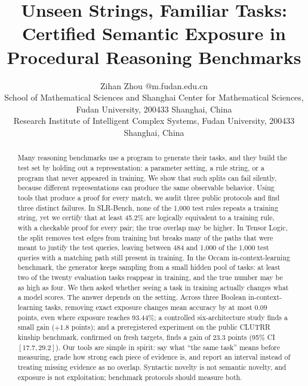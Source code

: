 \documentclass[twoside,11pt]{article}
\begin{document}
\title{Unseen Strings, Familiar Tasks: Certified Semantic Exposure in
Procedural Reasoning Benchmarks}

\author{\name Zihan Zhou @m.fudan.edu.cn \\
       \addr School of Mathematical Sciences and Shanghai Center for
       Mathematical Sciences, Fudan University, 200433 Shanghai, China \\
       \addr Research Institute of Intelligent Complex Systems,
       Fudan University, 200433 Shanghai, China}

\maketitle

\begin{abstract}
Many reasoning benchmarks use a program to generate their tasks, and they
build the test set by holding out a representation: a parameter setting, a
rule string, or a program that never appeared in training.  We show that
such splits can fail silently, because different representations can
produce the same observable behavior.  Using tools that produce a proof for
every match, we audit three public protocols and find three distinct
failures.  In SLR-Bench, none of the 1,000 test rules repeats a training
string, yet we certify that at least 45.2\% are logically equivalent to a
training rule, with a checkable proof for every pair; the true overlap may
be higher.  In Tensor Logic, the split removes test edges from training but
breaks many of the paths that were meant to justify the test queries,
leaving between 484 and 1,000 of the 1,000 test queries with a matching
path still present in training.  In the Occam in-context-learning
benchmark, the generator keeps sampling from a small hidden pool of tasks:
at least two of the twenty evaluation tasks reappear in training, and the
true number may be as high as four.  We then asked whether seeing a task in
training actually changes what a model scores.  The answer depends on the
setting.  Across three Boolean in-context-learning tasks, removing exact
exposure changes mean accuracy by at most 0.09 points, even where exposure
reaches 93.44\%; a controlled six-architecture study finds a small gain
($+1.8$ points); and a preregistered experiment on the public CLUTRR
kinship benchmark, confirmed on fresh targets, finds a gain of $23.3$
points (95\% CI $[17.7, 29.2]$).  Our tools are simple in spirit: say what
``the same task'' means before measuring, grade how strong each piece of
evidence is, and report an interval instead of treating missing evidence as
no overlap.  Syntactic novelty is not semantic novelty, and exposure is not
exploitation; benchmark protocols should measure both.
\end{abstract}
\end{document}
